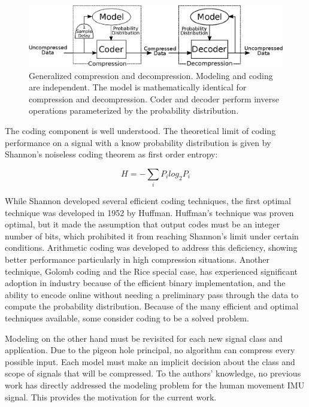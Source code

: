 \documentclass[journal]{IEEEtran}
\begin{document}
\begin{figure}
  \includegraphics[width=\linewidth]{general_compressor4.eps}
  \caption{Generalized compression and decompression. Modeling and coding are independent. The model is mathematically identical for compression and decompression. Coder and decoder perform inverse operations parameterized by the probability distribution.}
  \label{fig:general_compressor}
\end{figure}

The coding component is well understood. The theoretical limit of coding performance on a signal with a know probability distribution is given by Shannon's noiseless coding theorem\cite{Shannon1948} as first order entropy:

$$H = -\sum_{i} P_ilog_2P_i$$

While Shannon developed several efficient coding techniques, the first optimal technique was developed in 1952 by Huffman\cite{Huffman1952}. Huffman's technique was proven optimal, but it made the assumption that output codes must be an integer number of bits, which prohibited it from reaching Shannon's limit under certain conditions. Arithmetic coding was developed to address this deficiency, showing better performance particularly in high compression situations\cite{Witten1987}. Another technique, Golomb coding and the Rice special case, has experienced significant adoption in industry because of the efficient binary implementation, and the ability to encode online without needing a preliminary pass through the data to compute the probability distribution\cite{Golomb1966}\cite{F.Rice1979}. Because of the many efficient and optimal techniques available, some consider coding to be a solved problem\cite{Mahoney2013}.

Modeling on the other hand must be revisited for each new signal class and application. Due to the pigeon hole principal, no algorithm can compress every possible input\cite{Kolmogorov1965}. Each model must make an implicit decision about the class and scope of signals that will be compressed. To the authors' knowledge, no previous work has directly addressed the modeling problem for the human movement IMU signal. This provides the motivation for the current work.
\end{document}
